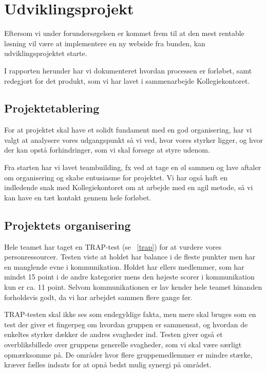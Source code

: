 \documentclass[12pt, a4paper]{report}
\begin{document}



\chapter{Udviklingsprojekt}

Eftersom vi under forundersøgelsen er kommet frem til at den mest rentable løsning vil være at implementere en ny webside fra bunden, kan udviklingsprojektet starte.

I rapporten herunder har vi dokumenteret hvordan processen er forløbet, samt redegjort for det produkt, som vi har lavet i sammenarbejde Kollegiekontoret.

\section{Projektetablering}

For at projektet skal have et solidt fundament med en god organisering, har vi valgt at analysere vores udgangspunkt så vi ved, hvor vores styrker ligger, og hvor der kan opstå forhindringer, som vi skal forsøge at styre udenom.

Fra starten har vi lavet teambuilding, fx ved at tage en øl sammen og lave aftaler om organisering og skabe entusiasme for projektet. Vi har også haft en indledende snak med Kollegiekontoret om at arbejde med en agil metode, så vi kan have en tæt kontakt gennem hele forløbet.

\section{Projektets organisering}

Hele teamet har taget en TRAP-test (se ~\ref{trap}) for at vurdere vores personressourcer. Testen viste at holdet har balance i de fleste punkter men har en manglende evne i kommunikation. Holdet har ellers medlemmer, som har mindst 15 point i de andre kategorier mens den højeste scorer i kommunikation kun er ca. 11 point. Selvom kommunikationen er lav kender hele teamet hinanden forholdsvis godt, da vi har arbejdet sammen flere gange før.

TRAP-testen skal ikke ses som endegyldige fakta, men mere skal bruges som en test der giver et fingerpeg om hvordan gruppen er sammensat, og hvordan de enkeltes styrker dækker de andres svagheder ind. Testen giver også et overbliksbillede over gruppens generelle svagheder, som vi skal være særligt opmærksomme på. De områder hvor flere gruppemedlemmer er mindre stærke, kræver fælles indsats for at opnå bedst mulig synergi på området.
\end{document}
